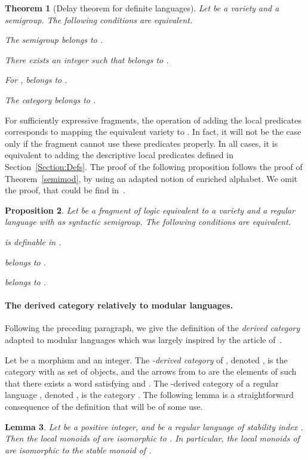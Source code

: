 \documentclass[submission,hidelink]{dmtcs-episciences}
\newtheorem{theorem}{Theorem}
\newtheorem{proposition}[theorem]{Proposition}
\newtheorem{lemma}[theorem]{Lemma}
\newenvironment{conditions}
{\begin{list}{\rm (\theenumi)}{\noindent \usecounter{enumi}\setlength{\topsep}{2pt}\setlength{\partopsep}{0pt}\setlength{\itemsep}{2pt}\setlength{\parsep}{0pt}\setlength{\leftmargin}{2.5em}\setlength{\labelwidth}{1.5em}\setlength{\labelsep}{0.5em}\setlength{\listparindent}{0pt}\setlength{\itemindent}{0pt}}}{\end{list}}
\begin{document}
		\begin{theorem}[Delay theorem for definite languages]\label{thm:delaydefinite}
			Let  be a variety and  a semigroup. The following conditions are equivalent.
			\begin{conditions}
				\item The semigroup  belongs to .
				\item There exists an integer  such that  belongs to .
				\item For ,  belongs to .
				\item The category  belongs to .
			\end{conditions}
		\end{theorem}
		For sufficiently expressive fragments, the operation of adding the local predicates corresponds to mapping the equivalent variety  to .
		In fact, it will not be the case only if the fragment cannot use these predicates properly.
		In all cases, it is equivalent to adding the descriptive local predicates defined in Section~\ref{Section:Defs}.
The proof of the following proposition follows the proof of Theorem~\ref{semimod}, by using an adapted
		notion of enriched alphabet. We omit the proof, that could be find in~\cite{PapermanPhd}.
	\begin{proposition}\label{Prop:localpredfragment}
			Let  be a
			fragment of logic equivalent to a variety  and
			 a regular language with  as syntactic semigroup.
			The following conditions are equivalent.
			\begin{conditions}
\item { is definable in .}
				\item  belongs to .
				\item  belongs to .
			\end{conditions}
		\end{proposition}
	\paragraph{The derived category relatively to modular languages.}
		Following the preceding paragraph, we give the definition of the \emph{derived category} adapted to
		modular languages which was largely inspired by the article of~\cite{CPS06b}.

Let  be a morphism and  an integer.
			The \emph{-derived category} of , denoted , is
			the category with  as set of objects,
			and the arrows from  to  are the elements  of  such
			that there exists a word  satisfying  and .
			The -derived category of a regular language , denoted , is the category .
			The following lemma is a straightforward consequence of the definition that will be of some use.
		\begin{lemma}\label{monLocaux}
		Let  be a positive integer, and  be a regular language of stability index .
		Then the local monoids of  are isomorphic to .
		In particular, the local monoids of  are isomorphic to the stable monoid of .
		\end{lemma}
\end{document}
